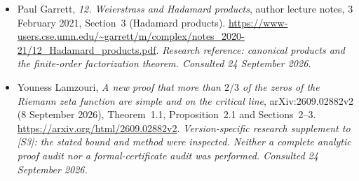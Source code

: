 \documentclass[11pt]{article}
\begin{document}
\begin{itemize}
\item[\textnormal{[E8]}]\hypertarget{extra:2:8}{} Paul Garrett,
\emph{12. Weierstrass and Hadamard products}, author lecture notes,
3 February 2021, Section~3 (Hadamard products).
\url{https://www-users.cse.umn.edu/~garrett/m/complex/notes_2020-21/12_Hadamard_products.pdf}.
{\small\textit{Research reference: canonical products and the finite-order
factorization theorem. Consulted 24 September 2026.}}

\item[\textnormal{[E9]}]\hypertarget{extra:2:9}{} Youness Lamzouri,
\emph{A new proof that more than $2/3$ of the zeros of the Riemann zeta
function are simple and on the critical line},
arXiv:2609.02882v2 (8 September 2026), Theorem~1.1,
Proposition~2.1 and Sections~2--3.
\url{https://arxiv.org/html/2609.02882v2}.
{\small\textit{Version-specific research supplement to [S3]: the stated bound
and method were inspected. Neither a complete analytic proof audit nor a
formal-certificate audit was performed. Consulted 24 September 2026.}}
\end{itemize}
\end{document}
